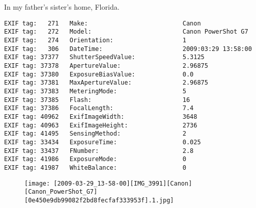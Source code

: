 \section{\protect{}}
\noindent In my father's sister's home, Florida.
\noindent
\begin{lstlisting}
EXIF tag:   271   Make:                          Canon
EXIF tag:   272   Model:                         Canon PowerShot G7
EXIF tag:   274   Orientation:                   1
EXIF tag:   306   DateTime:                      2009:03:29 13:58:00
EXIF tag: 37377   ShutterSpeedValue:             5.3125
EXIF tag: 37378   ApertureValue:                 2.96875
EXIF tag: 37380   ExposureBiasValue:             0.0
EXIF tag: 37381   MaxApertureValue:              2.96875
EXIF tag: 37383   MeteringMode:                  5
EXIF tag: 37385   Flash:                         16
EXIF tag: 37386   FocalLength:                   7.4
EXIF tag: 40962   ExifImageWidth:                3648
EXIF tag: 40963   ExifImageHeight:               2736
EXIF tag: 41495   SensingMethod:                 2
EXIF tag: 33434   ExposureTime:                  0.025
EXIF tag: 33437   FNumber:                       2.8
EXIF tag: 41986   ExposureMode:                  0
EXIF tag: 41987   WhiteBalance:                  0

\end{lstlisting}
\clearpage
\begin{figure}
\raggedleft
\texttt{[image: [2009-03-29\_13-58-00][IMG\_3991][Canon][Canon\_PowerShot\_G7][0e450e9db99082f2bd8fecfaf333953f].1.jpg]}
\end{figure}


\clearpage
